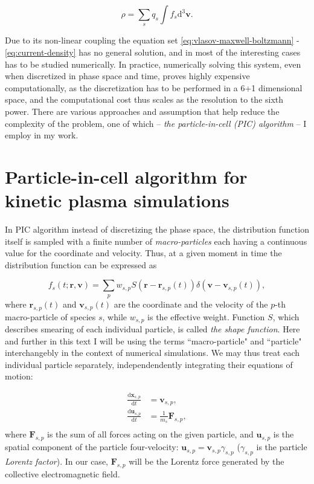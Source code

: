 \begin{equation}
  \label{eq:charge-density}
  \rho = \sum_s q_s \int f_s \mathrm{d}^3 \bm{v}.
\end{equation}

Due to its non-linear coupling the equation set \eqref{eq:vlasov-maxwell-boltzmann} - \eqref{eq:current-density} has no general solution, and in most of the interesting cases has to be studied numerically. In practice, numerically solving this system, even when discretized in phase space and time, proves highly expensive computationally, as the discretization has to be performed in a 6+1 dimensional space, and the computational cost thus scales as the resolution to the sixth power. There are various approaches and assumption that help reduce the complexity of the problem, one of which -- \emph{the particle-in-cell (PIC) algorithm} -- I employ in my work.

\section{Particle-in-cell algorithm for kinetic plasma simulations}
\label{sec:pic}

In PIC algorithm \citep{1986ITPS...14..661B, 1991ppcs.book.....B} instead of discretizing the phase space, the distribution function itself is sampled with a finite number of \emph{macro-particles} each having a continuous value for the coordinate and velocity. Thus, at a given moment in time the distribution function can be expressed as

\begin{equation}
  \label{eq:pic-df}
  f_s(t;\bm{r},\bm{v}) = \sum_p w_{s,p}S\left(\bm{r} - \bm{r}_{s,p}(t)\right)\delta\left(\bm{v}-\bm{v}_{s,p}(t)\right),
\end{equation}
\noindent where $\bm{r}_{s,p}(t)$ and $\bm{v}_{s,p}(t)$ are the coordinate and the velocity of the $p$-th macro-particle of species $s$, while $w_{s,p}$ is the effective weight. Function $S$, which describes smearing of each individual particle, is called \emph{the shape function}. Here and further in this text I will be using the terms ``macro-particle" and ``particle" interchangebly in the context of numerical simulations. We may thus treat each individual particle separately, independendently integrating their equations of motion:

\begin{equation}
  \label{eq:eom}
\begin{aligned}
  \frac{\mathrm{d}\bm{x}_{s,p}}{\mathrm{d}t} &= \bm{v}_{s,p},\\
  \frac{\mathrm{d}\bm{u}_{s,p}}{\mathrm{d}t} &= \frac{1}{m_s}\bm{F}_{s,p},\\
\end{aligned}
\end{equation}
\noindent where $\bm{F}_{s,p}$ is the sum of all forces acting on the given particle, and $\bm{u}_{s,p}$ is the spatial component of the particle four-velocity: $\bm{u}_{s,p} = \bm{v}_{s,p}\gamma_{s,p}$ ($\gamma_{s,p}$ is the particle \emph{Lorentz factor}). In our case, $\bm{F}_{s,p}$ will be the Lorentz force generated by the collective electromagnetic field.


